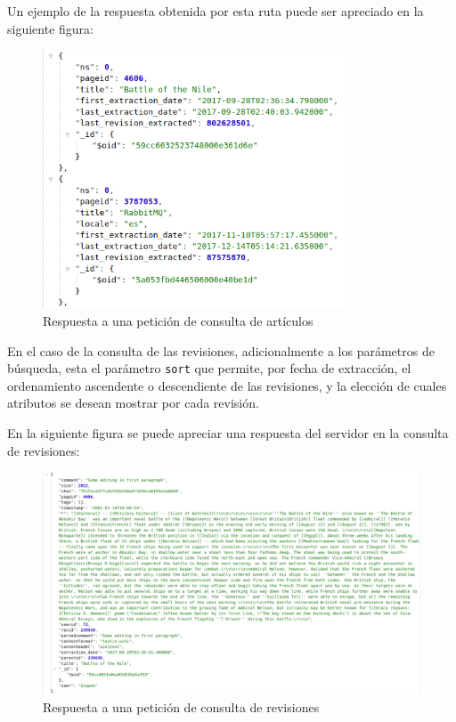 Un ejemplo de la respuesta obtenida por esta ruta puede ser apreciado en la siguiente figura:

\begin{figure}[H]
	\centering
		\includegraphics[width=0.8\textwidth]{figures/response_articles}
	\caption{Respuesta a una petición de consulta de artículos}
	\label{fig:response_articles}
\end{figure}

En el caso de la consulta de las revisiones, adicionalmente a los parámetros de búsqueda, esta el parámetro \texttt{sort} que permite, por fecha de extracción, el
ordenamiento ascendente o descendiente de las revisiones, y la elección de cuales
atributos se desean mostrar por cada revisión.

En la siguiente figura se puede apreciar una respuesta del servidor en la consulta de
revisiones:

\begin{figure}[H]
	\centering
		\includegraphics[width=1\textwidth]{figures/response_revisions}
	\caption{Respuesta a una petición de consulta de revisiones}
	\label{fig:response_revisions}
\end{figure}

